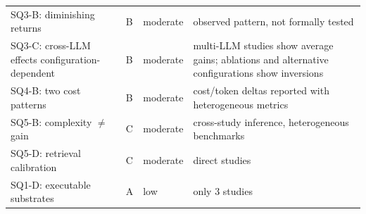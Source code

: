\begin{table}[htbp]
\begin{tabularx}{\textwidth}{@{} >{\raggedright\arraybackslash}p{5.4cm} >{\centering\arraybackslash}p{0.7cm} >{\centering\arraybackslash}p{1.5cm} >{\raggedright\arraybackslash}X @{}}
    \midrule
    SQ3-B: diminishing returns & B & moderate & observed pattern,
      not formally tested \\
    SQ3-C: cross-LLM effects configuration-dependent & B & moderate &
      2 multi-LLM studies show average gains; ablations and alternative
      configurations show inversions \\
    SQ4-B: two cost patterns & B & moderate &
      cost/token deltas reported with heterogeneous metrics \\
    SQ5-B: complexity $\neq$ gain & C & moderate & cross-study
      inference, heterogeneous benchmarks \\
    SQ5-D: retrieval calibration & C & moderate & 2 direct studies \\
    \midrule
    SQ1-D: executable substrates & A & low & only 3 studies \\
    \bottomrule
  \end{tabularx}
\end{table}
